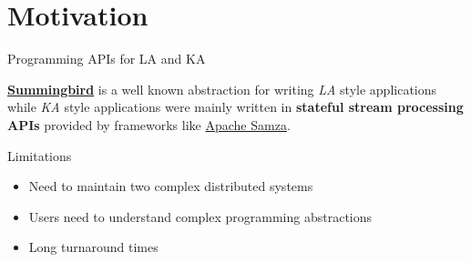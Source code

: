 \documentclass[newPxFont]{beamer}
\renewcommand{\event}[3][e]{%
  \pgfmathsetlength\xstop{(#2-\theyearstart)*\unit}%
  \ifx #1e%
    \draw[fill=black,draw=none,opacity=0.5]%
      (\xstop, 0) circle (.2\unit)%
      node[opacity=1,rotate=45,right=.2\unit] {#3};%
  \else%
    \pgfmathsetlength\xstart{(#1-\theyearstart)*\unit}%
    \draw[fill=black,draw=none,opacity=0.5,rounded corners=.1\unit]%
      (\xstart,-.1\unit) rectangle%
      node[opacity=1,rotate=45,right=.2\unit] {#3} (\xstop,.1\unit);%
  \fi}%
\begin{document}






%
%

\section{Motivation}


\begin{frame}{Programming APIs for LA and KA}

\href{https://github.com/twitter/summingbird}{\textbf{Summingbird}} is a well known abstraction for writing \textit{LA} style applications while \textit{KA} style applications were mainly written in \textbf{stateful stream processing APIs} provided by frameworks like \href{http://samza.apache.org}{Apache Samza}.

\begin{block}{Limitations}
\begin{itemize}
	\item Need to maintain two complex distributed systems
	\item Users need to understand complex programming abstractions 
	\item Long turnaround times
\end{itemize}
\end{block}

\end{frame}
\end{document}
